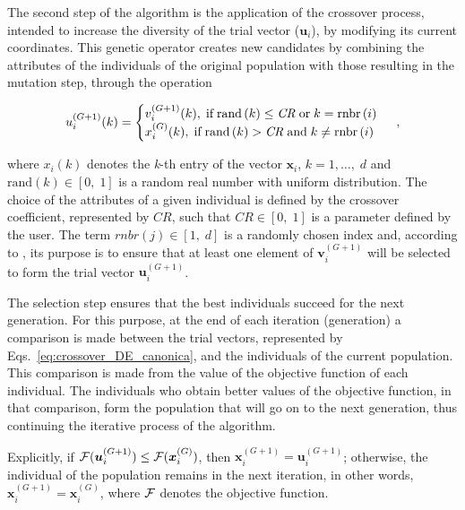 \documentclass[smallextended]{svjour3}       %
\begin{document}
The second step of the algorithm is the application of the crossover process, intended to increase the diversity of the trial vector ($\boldsymbol{u}_{i}$), by modifying its current coordinates. This genetic operator creates new candidates by combining the attributes of the individuals of the original population with those resulting in the mutation step, through the operation

\begin{equation} \label{eq:crossover_DE_canonica}
 u_{i} ^{\left(G+1\right)} (k) =
 \begin{cases}
 v_{i} ^{\left(G+1\right)} (k), \; \text{if} \; \text{rand}\left(k\right) \leq \text{\emph{CR}} \; \text{or} \; k = \text{rnbr}\left( i \right)\\
 x_{i} ^{\left(G\right)} (k), \; \text{if} \; \text{rand}\left(k\right) > \text{\emph{CR}} \; \text{and} \; k \neq \text{rnbr}\left( i \right)
 \end{cases} \; ,
 \end{equation}
 
\noindent where $x_ {i} (k)$ denotes the \textit{k}-th entry of the vector $ \boldsymbol{x}_ {i}$, $k = 1, \dots, \; d$ and $ \text{rand} \left(k \right) \in \left[0, \; 1 \right] $ is a random real number with uniform distribution. The choice of the attributes of a given individual is defined by the crossover coefficient, represented by $ CR $, such that $ CR \in \left[0,\;1\right] $ is a parameter defined by the user. The term $rnbr \left( j \right) \in \left[1,\;d\right]$ is a randomly chosen index and, according to \cite{bib:storn1997differential}, its purpose is to ensure that at least one element of $\boldsymbol{v}_{i}^{\left(G+1\right)}$ will be selected to form the trial vector $\boldsymbol{u}_{i}^{\left(G+1\right)}$.

The selection step ensures that the best individuals succeed for the next generation. For this purpose, at the end of each iteration (generation) a comparison is made between the trial vectors, represented by Eqs.~\ref{eq:crossover_DE_canonica}, and the individuals of the current population. This comparison is made from the value of the objective function of each individual. The individuals who obtain better values of the objective function, in that comparison, form the population that will go on to the next generation, thus continuing the iterative process of the algorithm.

Explicitly, if ${\cal {F}}(\boldsymbol{u}_{i}^{(G + 1)}) \leq {\cal{F}}(\boldsymbol{x}_{i}^{(G)})$, then $\boldsymbol{x}_{i}^{(G + 1)} = \boldsymbol{u}_{i}^{(G + 1)}$; otherwise, the individual of the population remains in the next iteration, in other words, $\boldsymbol{x}_{i}^{(G + 1)} = \boldsymbol{x}_{i}^{(G)}$, where ${\cal {F}}$ denotes the objective function.
\end{document}
